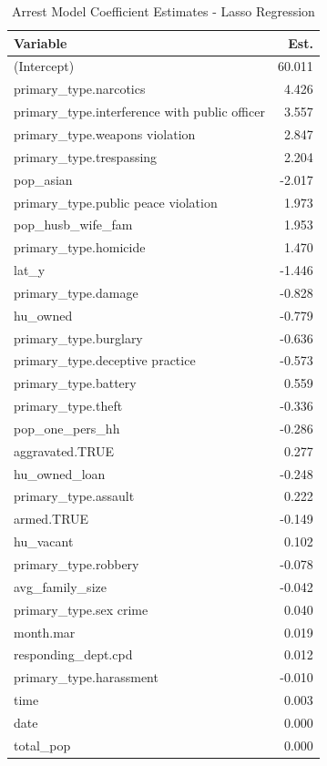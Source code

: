 \documentclass{ucetd}
\begin{document}
\begin{table}

\caption{\label{tab:arrest-lasso}Arrest Model Coefficient Estimates - Lasso Regression}
\centering
\begin{tabular}[t]{l|r}
\hline
Variable & Est.\\
\hline
(Intercept) & 60.011\\
\hline
primary\_type.narcotics & 4.426\\
\hline
primary\_type.interference with public officer & 3.557\\
\hline
primary\_type.weapons violation & 2.847\\
\hline
primary\_type.trespassing & 2.204\\
\hline
pop\_asian & -2.017\\
\hline
primary\_type.public peace violation & 1.973\\
\hline
pop\_husb\_wife\_fam & 1.953\\
\hline
primary\_type.homicide & 1.470\\
\hline
lat\_y & -1.446\\
\hline
primary\_type.damage & -0.828\\
\hline
hu\_owned & -0.779\\
\hline
primary\_type.burglary & -0.636\\
\hline
primary\_type.deceptive practice & -0.573\\
\hline
primary\_type.battery & 0.559\\
\hline
primary\_type.theft & -0.336\\
\hline
pop\_one\_pers\_hh & -0.286\\
\hline
aggravated.TRUE & 0.277\\
\hline
hu\_owned\_loan & -0.248\\
\hline
primary\_type.assault & 0.222\\
\hline
armed.TRUE & -0.149\\
\hline
hu\_vacant & 0.102\\
\hline
primary\_type.robbery & -0.078\\
\hline
avg\_family\_size & -0.042\\
\hline
primary\_type.sex crime & 0.040\\
\hline
month.mar & 0.019\\
\hline
responding\_dept.cpd & 0.012\\
\hline
primary\_type.harassment & -0.010\\
\hline
time & 0.003\\
\hline
date & 0.000\\
\hline
total\_pop & 0.000\\
\hline
\end{tabular}
\end{table}
\end{document}
